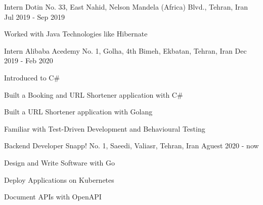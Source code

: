 

\begin{cventries}

  \cventry
    {Intern} %
    {Dotin} %
    {No. 33, East Nahid, Nelson Mandela (Africa) Blvd., Tehran, Iran} %
    {Jul 2019 - Sep 2019} %
    {
      \begin{cvitems} %
        \item {Worked with Java Technologies like Hibernate}
      \end{cvitems}
    }

  \cventry
    {Intern} %
    {Alibaba Acedemy} %
    {No. 1, Golha, 4th Bimeh, Ekbatan, Tehran, Iran} %
    {Dec 2019 - Feb 2020} %
    {
      \begin{cvitems} %
        \item {Introduced to C\#}
        \item {Built a Booking and URL Shortener application with C\#}
        \item {Built a URL Shortener application with Golang}
        \item {Familiar with Test-Driven Development and Behavioural Testing}
      \end{cvitems}
    }
    
  \cventry
    {Backend Developer} %
    {Snapp!} %
    {No. 1, Saeedi, Valiasr, Tehran, Iran} %
    {Aguest 2020 - now} %
    {
      \begin{cvitems} %
        \item {Design and Write Software with Go}
        \item {Deploy Applications on Kubernetes}
        \item {Document APIs with OpenAPI}
      \end{cvitems}
    }

\end{cventries}

